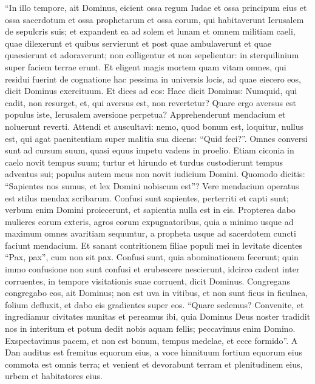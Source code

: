 \begin{biblechapter}  
\verse “In illo tempore, ait Dominus, eicient ossa regum Iudae et ossa principum eius et ossa sacerdotum et ossa prophetarum et ossa eorum, qui habitaverunt Ierusalem de sepulcris suis; 
\verse et expandent ea ad solem et lunam et omnem militiam caeli, quae dilexerunt et quibus servierunt et post quae ambulaverunt et quae quaesierunt et adoraverunt; non colligentur et non sepelientur: in sterquilinium super faciem terrae erunt. 
\verse Et eligent magis mortem quam vitam omnes, qui residui fuerint de cognatione hac pessima in universis locis, ad quae eiecero eos, dicit Dominus exercituum. 
\verse Et dices ad eos: Haec dicit Dominus: Numquid, qui cadit, non resurget, et, qui aversus est, non revertetur? 
\verse Quare ergo aversus est populus iste, Ierusalem aversione perpetua? Apprehenderunt mendacium et noluerunt reverti. 
\verse Attendi et auscultavi: nemo, quod bonum est, loquitur, nullus est, qui agat paenitentiam super malitia sua dicens: “Quid feci?”. Omnes conversi sunt ad cursum suum, quasi equus impetu vadens in proelio. 
\verse Etiam ciconia in caelo novit tempus suum; turtur et hirundo et turdus custodierunt tempus adventus sui; populus autem meus non novit iudicium Domini. 
\verse Quomodo dicitis: “Sapientes nos sumus, et lex Domini nobiscum est”? Vere mendacium operatus est stilus mendax scribarum. 
\verse Confusi sunt sapientes, perterriti et capti sunt; verbum enim Domini proiecerunt, et sapientia nulla est in eis. 
\verse Propterea dabo mulieres eorum exteris, agros eorum expugnatoribus, quia a minimo usque ad maximum omnes avaritiam sequuntur, a propheta usque ad sacerdotem cuncti faciunt mendacium. 
\verse Et sanant contritionem filiae populi mei in levitate dicentes “Pax, pax”, cum non sit pax. 
\verse Confusi sunt, quia abominationem fecerunt; quin immo confusione non sunt confusi et erubescere nescierunt, idcirco cadent inter corruentes, in tempore visitationis suae corruent, dicit Dominus. 
\verse Congregans congregabo eos, ait Dominus; non est uva in vitibus, et non sunt ficus in ficulnea, folium defluxit, et dabo eis gradientes super eos. 
\verse “Quare sedemus? Convenite, et ingrediamur civitates munitas et pereamus ibi, quia Dominus Deus noster tradidit nos in interitum et potum dedit nobis aquam fellis; peccavimus enim Domino. 
\verse Exspectavimus pacem, et non est bonum, tempus medelae, et ecce formido”. 
\verse A Dan auditus est fremitus equorum eius, a voce hinnituum fortium equorum eius commota est omnis terra; et venient et devorabunt terram et plenitudinem eius, urbem et habitatores eius. 

\end{biblechapter}
